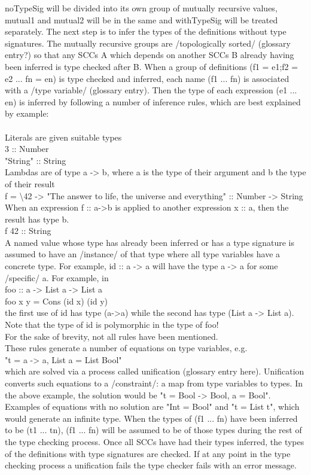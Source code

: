 noTypeSig will be divided into its own group of mutually recursive values, mutual1 and mutual2 will be in the same and withTypeSig will be treated separately. The next step is to infer the types of the definitions without type signatures. The mutually recursive groups are /topologically sorted/ (glossary entry?) so that any SCCs A which depends on another SCCs B already having been inferred is type checked after B. When a group of definitions (f1 = e1;f2 = e2 ... fn = en) is type checked and inferred, each name (f1 ... fn) is associated with a /type variable/ (glossary entry). Then the type of each expression (e1 ... en) is inferred by following a number of inference rules, which are best explained by example: \\ \\
Literals are given suitable types\\
3 :: Number \\
"String" :: String \\
Lambdas are of type a -> b, where a is the type of their argument and b the type of their result \\
f = \textbackslash 42 -> "The answer to life, the universe and everything" :: Number -> String \\
When an expression f :: a->b is applied to another expression x :: a, then the result has type b. \\
f 42 :: String\\
A named value whose type has already been inferred or has a type signature is assumed to have an /instance/ of that type where all type variables have a concrete type. For example, id :: a -> a will have the type a -> a for some /specific/ a. For example, in \\
foo :: a -> List a -> List a \\
foo x y = Cons (id x) (id y) \\
the first use of id has type (a->a) while the second has type (List a -> List a). Note that the type of id is polymorphic in the type of foo!\\
For the sake of brevity, not all rules have been mentioned. \\

These rules generate a number of equations on type variables, e.g. \\
"t = a -> a, List a = List Bool" \\ which are solved via a process called unification (glossary entry here). Unification converts such equations to a /constraint/: a map from type variables to types. In the above example, the solution would be "t = Bool -> Bool, a = Bool". Examples of equations with no solution are "Int = Bool" and "t = List t", which would generate an infinite type.
When the types of (f1 ... fn) have been inferred to be (t1 ... tn), (f1 ... fn) will be assumed to be of those types during the rest of the type checking process. Once all SCCs have had their types inferred, the types of the definitions with type signatures are checked. If at any point in the type checking process a unification fails the type checker fails with an error message.

